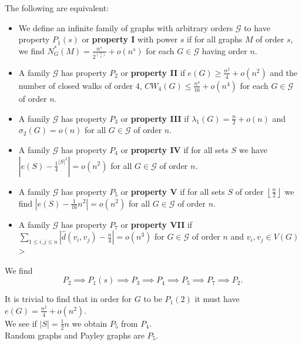 \begin{definition}
	The following are equivalent:
	\begin{itemize}
		\item We define an infinite family of graphs with arbitrary orders \(\mathscr{G}\) to have property \(P_1\left( s \right) \) or  \textbf{property I} with power \(s\) if for all graphs \(M\) of order \(s\), we find \(N_{G}^{*}\left( M \right) = \frac{n^{s}}{2^{\binom{n}{2}}} + o\left( n^{s} \right) \) for each \(G \in \mathscr{G}\) having order \(n\).
		\item A family \(\mathscr{G}\) has property \(P_2\) or \textbf{property II} if \(e\left( G \right)  \ge \frac{n^2}{4} + o\left( n^2 \right) \) and the number of closed walks of order \(4\), \(CW_4 \left( G \right) \le \frac{n^{4}}{16}+ o\left( n^{4} \right) \) for each \(G \in \mathscr{G}\) of order \(n\).
		\item A family \(\mathscr{G}\) has property \(P_3\) or \textbf{property III} if \(\lambda_1\left( G \right) = \frac{n}{2} + o\left( n \right) \) and \(\sigma_2\left( G \right)  = o\left( n \right) \) for all \(G \in \mathscr{G}\) of order \(n\).
		\item A family \(\mathscr{G}\) has property \(P_4\) or \textbf{property IV} if for all sets \(S\) we have \(\left| e\left( S \right) - \frac{1}{4}^{\left| S \right| ^2} \right| = o\left( n^2 \right) \) for all \(G \in \mathscr{G}\) of order \(n\).
		\item A family \(\mathscr{G}\) has property \(P_5\) or \textbf{property V} if for all sets \(S\) of order \(\left\lfloor \frac{n}{2} \right\rfloor\) we find \(\left| e\left( S \right) - \frac{1}{16}n^2 \right|  = o\left( n^2 \right) \) for all \(G \in \mathscr{G}\) of order \(n\).
		\item A family \(\mathscr{G}\) has property \(P_7\) or \textbf{property VII} if \(\sum_{1 \le i, j \le n}^{} \left| \hat{d}\left( v_{i}, v_{j} \right) - \frac{n}{4} \right| = o\left( n^3 \right) \) for \(G \in \mathscr{G}\) of order \(n\) and \(v_{i}, v_{j} \in V\left( G \right) \)>
	\end{itemize}
	We find \[
		P_2 \implies P_1\left( s \right) \implies P_3 \implies P_4 \implies P_5 \implies P_7 \implies P_2
	.\]
\end{definition}
\begin{example}
	It is trivial to find that in order for \(G\) to be \(P_1\left( 2 \right) \) it must have \(e\left( G \right)  = \frac{n^2}{4} + o\left( n^2 \right) \).\\
	We see if \(\left| S \right| =\frac{1}{2}n\) we obtain \(P_5\) from \(P_4\).\\
Random graphs and Payley graphs are \(P_5\).
\end{example}
